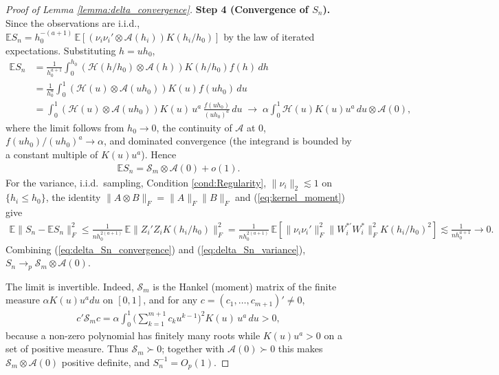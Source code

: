 \documentclass{article}
\newcommand{\normm}[1]{\lVert#1\rVert}
\newcommand{\E}{\mathbb{E}}
\begin{document}
\begin{appendices}
\begin{proof}[Proof of Lemma \ref{lemma:delta_convergence}]
    \textbf{Step 4 (Convergence of $S_n$).}
    Since the observations are i.i.d.,
    $\E S_n = h_0^{-(a+1)}\,\E\!\left[\left(\nu_i\nu_i'\otimes \mathcal{A}(h_i)\right)K(h_i/h_0)\right]$
    by the law of iterated expectations. Substituting $h=uh_0$,
    \begin{align*}
        \E S_n
        &= \frac{1}{h_0^{a+1}}\int_{0}^{h_0}
        \left(\mathcal{H}(h/h_0)\otimes\mathcal{A}(h)\right)K(h/h_0)f(h)\,dh\\
        &= \frac{1}{h_0^{a}}\int_{0}^{1}
        \left(\mathcal{H}(u)\otimes\mathcal{A}(uh_0)\right)K(u)f(uh_0)\,du\\
        &= \int_{0}^{1}\left(\mathcal{H}(u)\otimes\mathcal{A}(uh_0)\right)K(u)\,u^{a}\,
        \frac{f(uh_0)}{(uh_0)^{a}}\,du
        \;\longrightarrow\;
        \alpha\int_{0}^{1}\mathcal{H}(u)K(u)u^{a}\,du \otimes \mathcal{A}(0),
    \end{align*}
    where the limit follows from $h_0\to0$, the continuity of $\mathcal{A}$ at $0$,
    $f(uh_0)/(uh_0)^{a}\to\alpha$, and dominated convergence (the integrand is
    bounded by a constant multiple of $K(u)u^{a}$). Hence
    \begin{align}\label{eq:delta_Sn_convergence}
        \E S_n = \mathcal{S}_m\otimes \mathcal{A}(0) + o(1).
    \end{align}
    For the variance, i.i.d.\ sampling, Condition \ref{cond:Regularity},
    $\normm{\nu_i}_2\lesssim 1$ on $\{h_i\le h_0\}$, the identity
    $\normm{A\otimes B}_F=\normm{A}_F\normm{B}_F$ and (\ref{eq:kernel_moment}) give
    \begin{align}\label{eq:delta_Sn_variance}
        \E\normm{S_n-\E S_n}_F^2
        \le \frac{1}{n h_0^{2(a+1)}}\,\E\normm{Z_i'Z_i K(h_i/h_0)}_F^2
        = \frac{1}{n h_0^{2(a+1)}}\,
        \E\left[\normm{\nu_i\nu_i'}_F^2\normm{W_i^{*\prime}W_i^{*}}_F^2 K(h_i/h_0)^2\right]
        \lesssim \frac{1}{nh_0^{a+1}}\to 0 .
    \end{align}
    Combining (\ref{eq:delta_Sn_convergence}) and (\ref{eq:delta_Sn_variance}),
    $S_n\to_p \mathcal{S}_m\otimes \mathcal{A}(0)$.
    
    The limit is invertible. Indeed, $\mathcal{S}_m$ is the Hankel (moment) matrix
    of the finite measure $\alpha K(u)u^{a}du$ on $[0,1]$, and for any
    $c=(c_1,\dots,c_{m+1})'\ne 0$,
    \begin{align*}
        c'\mathcal{S}_m c
        = \alpha\int_0^1\Big(\sum_{k=1}^{m+1}c_k u^{k-1}\Big)^2 K(u)\,u^{a}\,du > 0,
    \end{align*}
    because a non-zero polynomial has finitely many roots while $K(u)u^{a}>0$ on a
    set of positive measure. Thus $\mathcal{S}_m\succ 0$; together with
    $\mathcal{A}(0)\succ0$ this makes
    $\mathcal{S}_m\otimes\mathcal{A}(0)$ positive definite, and $S_n^{-1}=O_p(1)$.
    

\end{proof}
\end{appendices}
\end{document}

